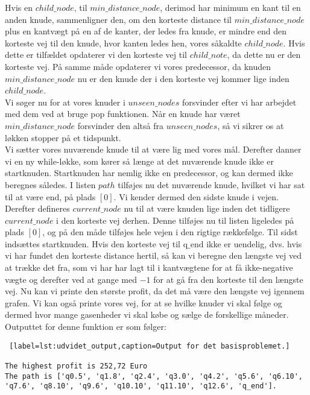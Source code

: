 Hvis en $child\_node$, til  $min\_distance\_node$, derimod har minimum en kant til en anden knude, sammenligner den, om den korteste distance til $min\_distance\_node$ plus en kantvægt på en af de kanter, der ledes fra knude, er mindre end den korteste vej til den knude, hvor kanten ledes hen, vores såkaldte $child\_node$. Hvis dette er tilfældet opdaterer vi den korteste vej til $child\_note$, da dette nu er den korteste vej. På samme måde opdaterer vi vores predecessor, da knuden $min\_distance\_node$ nu er den knude der i den korteste vej kommer lige inden $child\_node$.\\
Vi søger nu for at vores knuder i $unseen\_nodes$ forsvinder efter vi har arbejdet med dem ved at bruge pop funktionen. Når en knude har været $min\_distance\_node$ forsvinder den altså fra $unseen\_nodes$, så vi sikrer os at løkken stopper på et tidspunkt. \\
Vi sætter vores nuværende knude til at være lig med vores mål.
Derefter danner vi en ny while-løkke, som kører så længe at det nuværende knude ikke er startknuden. Startknuden har nemlig ikke en predecessor, og kan dermed ikke beregnes således. I listen $path$ tilføjes nu det nuværende knude, hvilket vi har sat til at være $\textrm{end}$, på plads $[0]$. Vi kender dermed den sidste knude i vejen. Derefter defineres $current\_node$ nu til at være knuden lige inden det tidligere $current\_node$ i den korteste vej derhen. Denne tilføjes nu til listen ligeledes på plads $[0]$, og på den måde tilføjes hele vejen i den rigtige rækkefølge. Til sidst indsættes startknuden.
Hvis den korteste vej til $\textrm{q\_end}$ ikke er uendelig, dvs. hvis vi har fundet den korteste distance hertil, så kan vi beregne den længste vej ved at trække det fra, som vi har har lagt til i kantvægtene for at få ikke-negative vægte og derefter ved at gange med $-1$ for at gå fra den korteste til den længste vej. 
Nu kan vi printe den største profit, da det må være den længste vej igennem grafen. Vi kan også printe vores vej, for at se hvilke knuder vi skal følge og dermed hvor mange gasenheder vi skal købe og sælge de forskellige måneder.
Outputtet for denne funktion er som følger:
\begin{lstlisting} [label=lst:udvidet_output,caption=Output for det basisproblemet.]

The highest profit is 252,72 Euro
The path is ['q0.5', 'q1.8', 'q2.4', 'q3.0', 'q4.2', 'q5.6', 'q6.10', 'q7.6', 'q8.10', 'q9.6', 'q10.10', 'q11.10', 'q12.6', 'q_end'].

\end{lstlisting}
